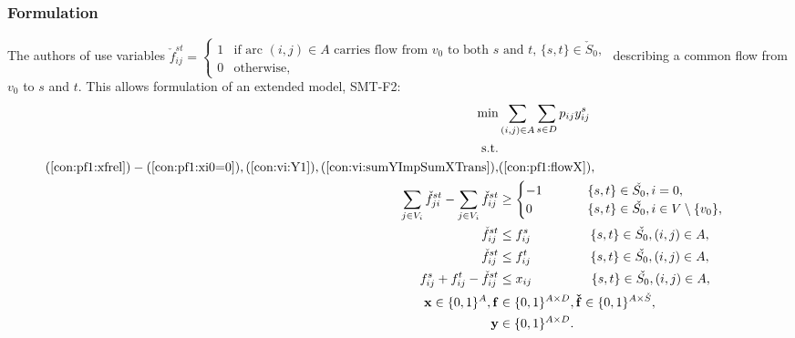 \subsubsection{Formulation}
The authors of \cite{Polzin} use variables
\newline\newline  
  $\check{f}^{st}_{ij}=
	\begin{cases}
    1 & \text{if arc $(i,j) \in A$ carries flow from $v_0$ to both $s$ and $t$, $\{s,t\}\in \check{S}_0$},\\
    0 & \text{otherwise},
  \end{cases}$
  \newline\newline  
  describing a common flow from $v_0$ to $s$ and $t$. This allows formulation of an extended model, SMT-F2: 
    \begin{subequations}
    \begin{flalign}
  \min &  \sum\limits_{(i,j) \in A} \sum\limits_{s \in D} p_{ij} y^s_{ij}    \\  \notag  
		   \text{s.t.}&                  && \\			   
		   (\ref{con:pf1:xfrel}) - (\ref{con:pf1:xi0=0}), (\ref{con:vi:Y1}),(\ref{con:vi:sumYImpSumXTrans}),&(\ref{con:pf1:flowX}),& \notag \\ 	
\label{con:pf2:flowHook}  \sum\limits_{\substack{ j \in V_i }}\check{f}^{st}_{ji}-\sum\limits_{\substack{j\in V_i}}\check{f}^{st}_{ij}    & \geq \begin{cases}
    -1~~~&  \{s,t\}\in \check{S_0}, i = 0, \\        0  ~~~~   \qquad         & \{s,t\}\in \check{S_0}, i\in V\setminus \{v_0\},\end{cases}     \\			
\label{con:pf2:startInSource}  \check{f}^{st}_{ij}    & \leq f^s_{ij}~~   \qquad  \qquad \{s,t\}\in \check{S_0}, (i,j)\in A, \\	
\label{con:pf2:stopInDest}  \check{f}^{st}_{ij}    & \leq f^t_{ij}~~   \qquad    \qquad \{s,t\}\in \check{S_0}, (i,j)\in A, \\			 		
 \label{con:pf2:stronger}  f^{s}_{ij}+f^{t}_{ij}-\check{f}^{st}_{ij}    &\leq x_{ij}    ~~ \qquad \qquad  \{s,t\}\in \check{S_0}, (i,j)\in A, \\			 	   			  
 \label{con:pf2:dim}  \mathbf{x}     \in \{0,1\}^A,  \mathbf{f}&\in \{0,1\}^{A\times D}, \mathbf{\check{f}}\in\{0,1\}^{A\times \check{S}},\\
 \label{con:pf2:dim2}  \mathbf{y} & \in \{0,1\}^{A\times D}.
    \end{flalign}~
    \end{subequations}

